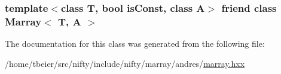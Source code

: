 \subsubsection[{Marray$<$ T, A $>$}]{\setlength{\rightskip}{0pt plus 5cm}template$<$class T, bool is\+Const, class A$>$ friend class {\bf Marray}$<$ T, A $>$\hspace{0.3cm}{\ttfamily [friend]}}\label{classandres_1_1Iterator_ad7bf464de20a2e1bbc38644d8615fba8}


The documentation for this class was generated from the following file\+:\begin{DoxyCompactItemize}
\item 
/home/tbeier/src/nifty/include/nifty/marray/andres/\hyperlink{andres_2marray_8hxx}{marray.\+hxx}\end{DoxyCompactItemize}
